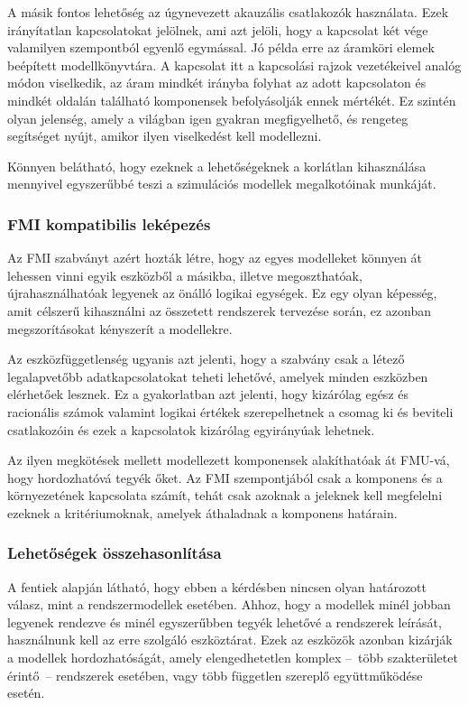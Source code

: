         A másik fontos lehetőség az úgynevezett akauzális csatlakozók használata. Ezek irányítatlan kapcsolatokat jelölnek, ami azt jelöli, hogy a kapcsolat két vége valamilyen szempontból egyenlő egymással. Jó példa erre az áramköri elemek beépített modellkönyvtára. A kapcsolat itt a kapcsolási rajzok vezetékeivel analóg módon viselkedik, az áram mindkét irányba folyhat az adott kapcsolaton és mindkét oldalán található komponensek befolyásolják ennek mértékét.
        Ez szintén olyan jelenség, amely a világban igen gyakran megfigyelhető, és rengeteg segítséget nyújt, amikor ilyen viselkedést kell modellezni.
        
        Könnyen belátható, hogy ezeknek a lehetőségeknek a korlátlan kihasználása mennyivel egyszerűbbé teszi a szimulációs modellek megalkotóinak munkáját.

        \subsubsection{FMI kompatibilis leképezés} \label{sec:fmiKompat}
        Az FMI szabványt azért hozták létre, hogy az egyes modelleket könnyen át lehessen vinni egyik eszközből a másikba, illetve megoszthatóak, újrahasználhatóak legyenek az önálló logikai egységek.
        Ez egy olyan képesség, amit célszerű kihasználni az összetett rendszerek tervezése során, ez azonban megszorításokat kényszerít a modellekre.
        
        Az eszközfüggetlenség ugyanis azt jelenti, hogy a szabvány csak a létező legalapvetőbb adatkapcsolatokat teheti lehetővé, amelyek minden eszközben elérhetőek lesznek.
        Ez a gyakorlatban azt jelenti, hogy kizárólag egész és racionális számok valamint logikai értékek szerepelhetnek a csomag ki és beviteli csatlakozóin és ezek a kapcsolatok kizárólag egyirányúak lehetnek.
        
        Az ilyen megkötések mellett modellezett komponensek alakíthatóak át FMU-vá, hogy hordozhatóvá tegyék őket.
        Az FMI szempontjából csak a komponens és a környezetének kapcsolata számít, tehát csak azoknak a jeleknek kell megfelelni ezeknek a kritériumoknak, amelyek áthaladnak a komponens határain.

        \subsubsection{Lehetőségek összehasonlítása}
        A fentiek alapján látható, hogy ebben a kérdésben nincsen olyan határozott válasz, mint a rendszermodellek esetében.
        Ahhoz, hogy a modellek minél jobban legyenek rendezve és minél egyszerűbben tegyék lehetővé a rendszerek leírását, használnunk kell az erre szolgáló eszköztárat.
        Ezek az eszközök azonban kizárják a modellek hordozhatóságát, amely elengedhetetlen komplex --~több szakterületet érintő~-- rendszerek esetében, vagy több független szereplő együttműködése esetén.
        
